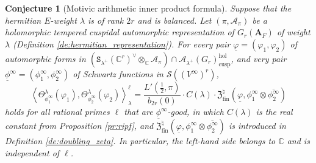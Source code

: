 \documentclass[12pt]{amsart}
\numberwithin{equation}{section}
\theoremstyle{plain}
\newtheorem{conjecture}[proposition]{Conjecture}
\theoremstyle{definition}
\theoremstyle{remark}
\renewcommand{\b}[1]{\mathbf{#1}}
\renewcommand{\c}[1]{\mathcal{#1}}
\renewcommand{\d}[1]{\mathbb{#1}}
\newcommand{\f}[1]{\mathfrak{#1}}
\renewcommand{\r}[1]{\mathrm{#1}}
\newcommand{\s}[1]{\mathscr{#1}}
\renewcommand{\(}{\left(}
\renewcommand{\)}{\right)}
\newcommand{\ol}[1]{\overline{#1}{}}
\newcommand{\ul}{\underline}
\newcommand{\bA}{\b A}
\newcommand{\cA}{\c A}
\newcommand{\dC}{\d C}
\newcommand{\fZ}{\f Z}
\newcommand{\sS}{\s S}
\newcommand{\tS}{\mathtt{S}}
\newcommand{\llangle}{\left\langle}
\newcommand{\rrangle}{\right\rangle}
\newcommand{\cusp}{\r{cusp}}
\newcommand{\fin}{\r{fin}}
\newcommand{\hol}{\r{hol}}
\begin{document}
\begin{conjecture}[Motivic arithmetic inner product formula]\label{co:maipf}
Suppose that the hermitian $E$-weight $\lambda$ is of rank $2r$ and is balanced. Let $(\pi,\cA_\pi)$ be a holomorphic tempered cuspidal automorphic representation of $G_r(\bA_F)$ of weight $\lambda$ (Definition \ref{de:hermitian_representation}). For every pair $\ul\varphi=(\varphi_1,\varphi_2)$ of automorphic forms in $\(\tS_{\lambda^+}(\dC^r)^\vee\otimes_\dC\cA_\pi\)\cap\cA_{\lambda^+}(G_r)_\cusp^\hol$, and very pair $\ul\phi^\infty=(\phi^\infty_1,\phi^\infty_2)$ of Schwartz functions in $\sS((V^\infty)^r)$,
\[
\llangle\Theta_{\phi^\infty_1}^\lambda(\varphi_1),\Theta_{\phi^\infty_2}^\lambda(\varphi_2)\rrangle_\lambda^\ell
=\frac{L'(\tfrac{1}{2},\pi)}{b_{2r}(0)}\cdot C(\lambda)\cdot
\fZ^\natural_\fin(\ul\varphi,\phi^\infty_1\otimes\ol{\phi^\infty_2})
\]
holds for all rational primes $\ell$ that are $\ul\phi^\infty$-good, in which $C(\lambda)$ is the real constant from Proposition \ref{pr:ripf}, and $\fZ^\natural_\fin(\ul\varphi,\phi^\infty_1\otimes\ol{\phi^\infty_2})$ is introduced in Definition \ref{de:doubling_zeta}. In particular, the left-hand side belongs to $\dC$ and is independent of $\ell$.
\end{conjecture}
\end{document}
